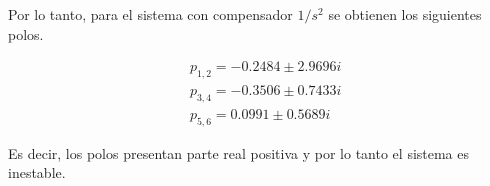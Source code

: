 Por lo tanto, para el sistema con compensador $1/s^2$ se obtienen los siguientes polos.


\begin{align*}
    &p_{1, 2} = -0.2484 \pm 2.9696 i\\
    &p_{3, 4} = -0.3506 \pm 0.7433 i\\
    &p_{5, 6} = 0.0991 \pm 0.5689 i
\end{align*}


\noindent Es decir, los polos presentan parte real positiva y por lo tanto el sistema es inestable.